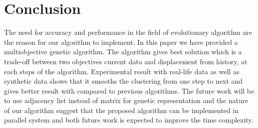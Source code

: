 \documentclass[12pt]{arsubmit}
\begin{document}
\section {Conclusion}
The need for accuracy and performance in the field of evolutionary algorithm are the reason for our algorithm to implement. In this paper we have provided a multiobjective genetic algorithm.  The algorithm gives best solution which is a trade-off between two objectives current data and displacement from history, at each steps of the algorithm. Experimental result with real-life data as well as synthetic data   shows that it smooths the clustering from one step to next and gives better result with compared to previous algorithms. The future work will be to use adjacency list instead of matrix for genetic representation and the nature of our algorithm suggest that the proposed algorithm can be implemented in parallel system and both future work is expected to improve the time complexity.
 

\end{document}
